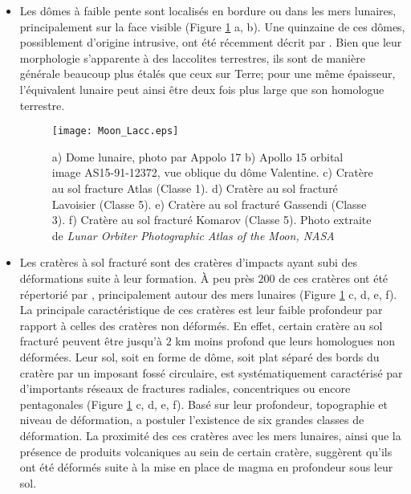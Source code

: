 \begin{itemize}
\item Les dômes  à faible pente sont localisés en  bordure ou dans les
  mers   lunaires,  principalement   sur  la   face  visible   (Figure
  \ref{Moon-magma} a,  b).  Une  quinzaine de ces  dômes, possiblement
  d'origine    intrusive,    ont     été    récemment    décrit    par
  \citet{Wohler:2007it}.  Bien que leur  morphologie s'apparente à des
  laccolites terrestres,  ils sont  de manière générale  beaucoup plus
  étalés que  ceux sur  Terre; pour  une même  épaisseur, l'équivalent
  lunaire  peut ainsi  être deux  fois  plus large  que son  homologue
  terrestre.

  \begin{figure}[htpb]
    \begin{center}
      \graphicspath{ {/Users/thorey/Documents/These/Manuscript/Figure/Chapter1/} }
      \texttt{[image: Moon\_Lacc.eps]}
      \caption{a)  Dome lunaire,  photo  par Appolo  17  b) Apollo  15
        orbital image  AS15-91-12372, vue  oblique du  dôme Valentine.
        c) Cratère au sol fracture Atlas (Classe 1). d) Cratère au sol
        fracturé  Lavoisier (Classe  5).  e)  Cratère au  sol fracturé
        Gassendi  (Classe  3).  f)  Cratère  au  sol fracturé  Komarov
        (Classe   5).   Photo   extraite   de  \textit{Lunar   Orbiter
          Photographic Atlas of the Moon, NASA}}
      \label{Moon-magma}
    \end{center}
  \end{figure}

\item Les  cratères à sol  fracturé sont des cratères  d'impacts ayant
  subi des déformations suite à leur  formation.  À peu près $ 200$ de
  ces   cratères  ont   été  répertorié   par  \citet{Schultz:1976kt},
  principalement autour des mers  lunaires (Figure \ref{Moon-magma} c,
  d, e,  f).  La principale  caractéristique de ces cratères  est leur
  faible profondeur  par rapport à  celles des cratères  non déformés.
  En effet, certain  cratère au sol fracturé peuvent  être jusqu'à $2$
  km moins profond que leurs homologues non déformées.  Leur sol, soit
  en  forme de  dôme, soit  plat séparé  des bords  du cratère  par un
  imposant  fossé  circulaire,  est systématiquement  caractérisé  par
  d'importants réseaux de fractures  radiales, concentriques ou encore
  pentagonales (Figure  \ref{Moon-magma} c, d,  e, f).  Basé  sur leur
  profondeur,     topographie     et    niveau     de     déformation,
  \citet{Schultz:1976kt} a postuler l'existence de six grandes classes
  de  déformation.   La  proximité  des ces  cratères  avec  les  mers
  lunaires, ainsi que  la présence de produits volcaniques  au sein de
  certain cratère, suggèrent  qu'ils ont été déformés suite  à la mise
  en place de magma en profondeur sous leur sol.
\end{itemize}

